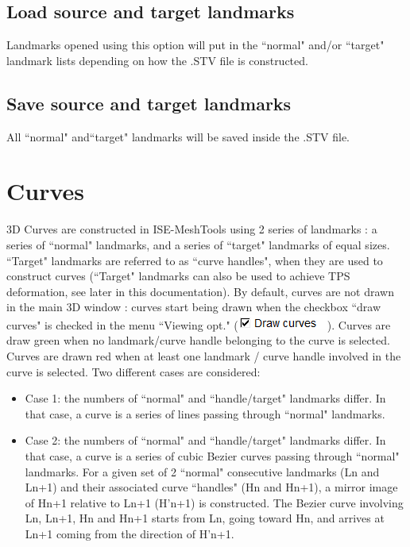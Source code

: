 \subsection{Load source and target landmarks}
Landmarks opened using this option will put in the ``normal" and/or ``target" landmark lists depending on how the .STV file is constructed.

\subsection{Save source and target landmarks}\label{STV_section}
All ``normal" and``target" landmarks will be saved inside the .STV file.

\section{Curves}\label{file_curve_section}
3D Curves are constructed in ISE-MeshTools using 2 series of landmarks : a series of ``normal"
landmarks, and a series of ``target" landmarks of equal sizes. ``Target" landmarks are referred to as
``curve handles", when they are used to construct curves (``Target" landmarks can also be used to
achieve TPS deformation, see later in this documentation). By default, curves are not drawn in the
main 3D window : curves start being drawn when the checkbox ``draw curves" is checked in the menu
``Viewing opt." (\includegraphics[scale=0.7]{images/Landmarks/Draw_curves.png}). Curves are draw green when no landmark/curve handle belonging to
the curve is selected. Curves are drawn red when at least one landmark / curve handle involved in the
curve is selected. Two different cases are considered:
\begin{itemize}

\item Case 1: the numbers of ``normal" and ``handle/target" landmarks differ. In that case, a curve is a series of lines passing through ``normal" landmarks.
\item Case 2: the numbers of ``normal" and ``handle/target" landmarks differ. In that case, a curve is a
series of cubic Bezier curves passing through ``normal" landmarks. For a given set of 2 ``normal"
consecutive landmarks (Ln and Ln+1) and their associated curve ``handles" (Hn and Hn+1), a mirror
image of Hn+1 relative to Ln+1 (H'n+1) is constructed. The Bezier curve involving Ln, Ln+1, Hn and
Hn+1 starts from Ln, going toward Hn, and arrives at Ln+1 coming from the direction of H'n+1.

\end{itemize}


